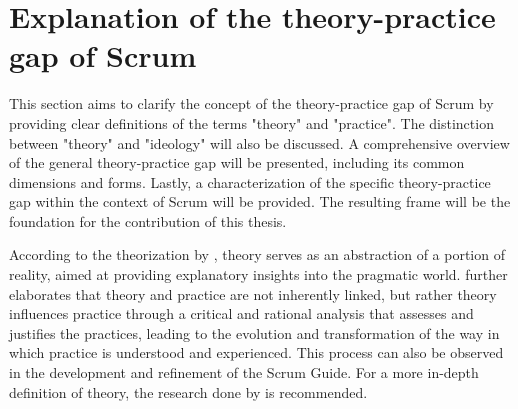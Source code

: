 
\newpage
{}

\section{Explanation of the theory-practice gap of Scrum}\label{sec:ExplanationGapScrum}
This section aims to clarify the concept of the theory-practice gap of Scrum by providing clear definitions of the terms "theory" and "practice". The distinction between "theory" and "ideology" will also be discussed. A comprehensive overview of the general theory-practice gap will be presented, including its common dimensions and forms. Lastly, a characterization of the specific theory-practice gap within the context of Scrum will be provided. The resulting frame will be the foundation for the contribution of this thesis.

According to the theorization by , theory serves as an abstraction of a portion of reality, aimed at providing explanatory insights into the pragmatic world.  further elaborates that theory and practice are not inherently linked, but rather theory influences practice through a critical and rational analysis that assesses and justifies the practices, leading to the evolution and \gls{transformation} of the way in which practice is understood and experienced. This process can also be observed in the development and refinement of the Scrum Guide. For a more in-depth definition of theory, the research done by  is recommended.

